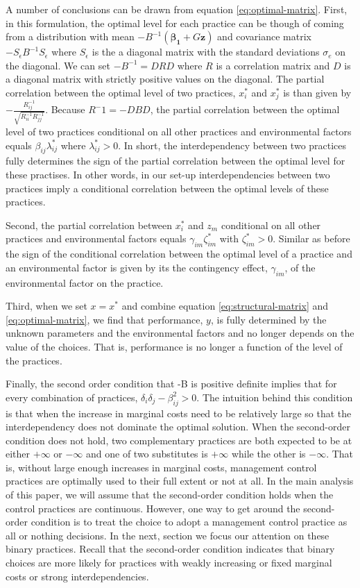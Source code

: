 \documentclass[12pt]{article}
\begin{document}
A number of conclusions can be drawn from equation \eqref{eq:optimal-matrix}. First, in this formulation, the optimal level for each practice can be though of coming from a distribution with mean $-B^{-1} (\mathbf{\beta_1} + G \mathbf{z})$ and covariance matrix $-S_{\epsilon} B^{-1} S_{\epsilon}$ where $S_{\epsilon}$ is the a diagonal matrix with the standard deviations $\sigma_e$ on the diagonal. We can set $-B^{-1} = DRD$ where $R$ is a correlation matrix and $D$ is a diagonal matrix with strictly positive values on the diagonal. The partial correlation between the optimal level of two practices, $x^*_i$ and $x^*_j$ is than given by $-\frac{R^{-1}_{ij}}{\sqrt{R^{-1}_{ii} R^{-1}_{jj}}}$. Because $R^-1 = - DBD$, the partial correlation between the optimal level of two practices conditional on all other practices and environmental factors equals $\beta_{ij}\lambda_{ij}^*$ where $\lambda_{ij}^* > 0$. In short, the interdependency between two practices fully determines the sign of the partial correlation between the optimal level for these practises. In other words, in our set-up interdependencies between two practices imply a conditional correlation between the optimal levels of these practices. 

Second, the partial correlation between $x^*_i$ and $z_m$ conditional on all other practices and environmental factors equals $\gamma_{im} \zeta_{im}^*$ with $\zeta_{im}^* > 0$. Similar as before the sign of the conditional correlation between the optimal level of a practice and an environmental factor is given by its the contingency effect, $\gamma_{im}$, of the environmental factor on the practice. 

Third, when we set $x = x^*$ and combine equation \eqref{eq:structural-matrix} and \eqref{eq:optimal-matrix}, we find that performance, $y$, is fully determined by the unknown parameters and the environmental factors and no longer depends on the value of the choices. That is, performance is no longer a function of the level of the practices. 

Finally, the second order condition that -B is positive definite implies that for every combination of practices, $\delta_i \delta_j - \beta_{ij}^2 > 0$. The intuition behind this condition is that when the increase in marginal costs need to be relatively large so that the interdependency does not dominate the optimal solution. When the second-order condition does not hold, two complementary practices are both expected to be at either \(+\infty\) or \(-\infty\) and one of two substitutes is \(+\infty\) while the other is \(-\infty\). That is, without large enough increases in marginal costs, management control practices are optimally used to their full extent or not at all. In the main analysis of this paper, we will assume that the second-order condition holds when the control practices are continuous. However, one way to get around the second-order condition is to treat the choice to adopt a management control practice as all or nothing decisions. In the next, section we focus our attention on these binary practices. Recall that the second-order condition indicates that binary choices are more likely for practices with weakly increasing or fixed marginal costs or strong interdependencies.
\end{document}
